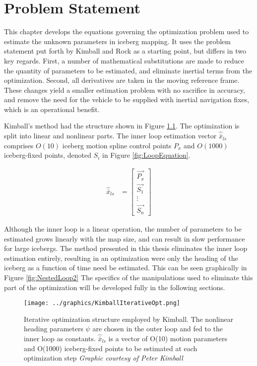 
\chapter{Problem Statement}
\label{ch.ProblemStatement}

This chapter develops the equations governing the optimization problem used to estimate the unknown parameters in iceberg mapping. It uses the problem statement put forth by Kimball and Rock \cite{} as a starting point, but differs in two key regards. First, a number of mathematical substitutions are made to reduce the quantity of parameters to be estimated, and eliminate inertial terms from the optimization. Second, all derivatives are taken in the moving reference frame. These changes yield a smaller estimation problem with no sacrifice in accuracy, and remove the need for the vehicle to be supplied with inertial navigation fixes, which is an operational benefit.

Kimball's method had the structure shown in Figure \ref{fig:NestedLoop}. The optimization is split into linear and nonlinear parts. The inner loop estimation vector $\hat{\bar{x}}_{ls}$ comprises $O(10)$ iceberg motion spline control points $P_x$ and $O(1000)$ iceberg-fixed points, denoted $S_i$ in Figure \ref{fig:LoopEquation}.

\begin{align}
\hat{\bar{x}}_{ls} &= 
        \left[\begin{array}{c}
        \vec{P_x}\\
        \vec{S_1}\\
        \vdots\\
        \vec{S_n}
        \end{array}
        \right]
\end{align}

Although the inner loop is a linear operation, the number of parameters to be estimated grows linearly with the map size, and can result in slow performance for large icebergs. The method presented in this thesis eliminates the inner loop estimation entirely, resulting in an optimization were only the heading of the iceberg as a function of time need be estimated. This can be seen graphically in Figure \ref{fig:NestedLoop2} The specifics of the manipulations used to eliminate this part of the optimization will be developed fully in the following sections. 

\begin{figure}[htbp]
   \centering
   \texttt{[image: ../graphics/KimballIterativeOpt.png]} %
   \caption{Iterative optimization structure employed by Kimball. The nonlinear heading parameters $\psi$ are chosen in the outer loop and fed to the inner loop as constants. $\hat{\bar{x}}_{ls}$ is a vector of O(10) motion parameters and O(1000) iceberg-fixed points to be estimated at each optimization step  \emph{Graphic courtesy of Peter Kimball}}
   \label{fig:NestedLoop}
\end{figure}

